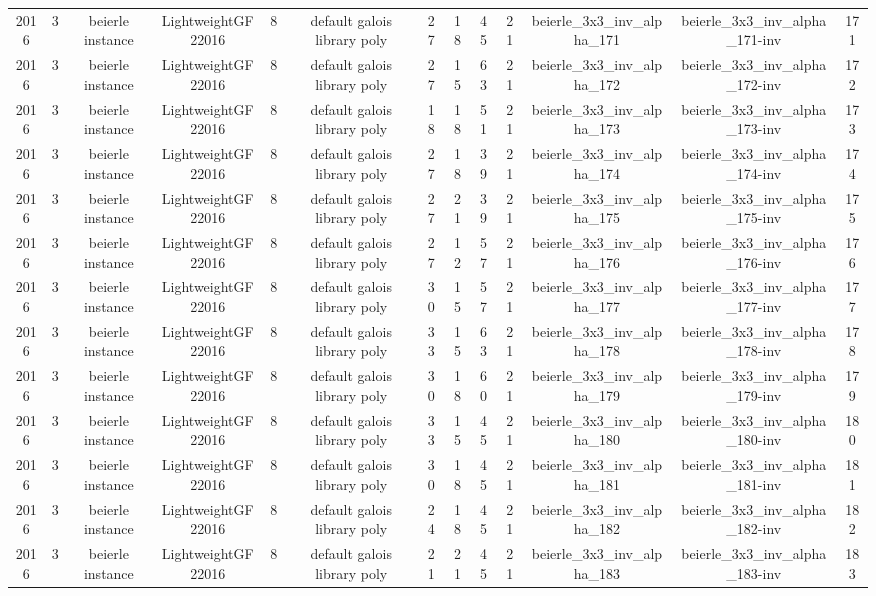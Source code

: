 \begin{tabular}{c c c c c c c c c c c c c}
2016 & 3 & beierle instance & LightweightGF22016 & 8 & default galois library poly & 27 & 18 & 45 & 21 & beierle_3x3_inv_alpha_171 & beierle_3x3_inv_alpha_171-inv & 171 \\
2016 & 3 & beierle instance & LightweightGF22016 & 8 & default galois library poly & 27 & 15 & 63 & 21 & beierle_3x3_inv_alpha_172 & beierle_3x3_inv_alpha_172-inv & 172 \\
2016 & 3 & beierle instance & LightweightGF22016 & 8 & default galois library poly & 18 & 18 & 51 & 21 & beierle_3x3_inv_alpha_173 & beierle_3x3_inv_alpha_173-inv & 173 \\
2016 & 3 & beierle instance & LightweightGF22016 & 8 & default galois library poly & 27 & 18 & 39 & 21 & beierle_3x3_inv_alpha_174 & beierle_3x3_inv_alpha_174-inv & 174 \\
2016 & 3 & beierle instance & LightweightGF22016 & 8 & default galois library poly & 27 & 21 & 39 & 21 & beierle_3x3_inv_alpha_175 & beierle_3x3_inv_alpha_175-inv & 175 \\
2016 & 3 & beierle instance & LightweightGF22016 & 8 & default galois library poly & 27 & 12 & 57 & 21 & beierle_3x3_inv_alpha_176 & beierle_3x3_inv_alpha_176-inv & 176 \\
2016 & 3 & beierle instance & LightweightGF22016 & 8 & default galois library poly & 30 & 15 & 57 & 21 & beierle_3x3_inv_alpha_177 & beierle_3x3_inv_alpha_177-inv & 177 \\
2016 & 3 & beierle instance & LightweightGF22016 & 8 & default galois library poly & 33 & 15 & 63 & 21 & beierle_3x3_inv_alpha_178 & beierle_3x3_inv_alpha_178-inv & 178 \\
2016 & 3 & beierle instance & LightweightGF22016 & 8 & default galois library poly & 30 & 18 & 60 & 21 & beierle_3x3_inv_alpha_179 & beierle_3x3_inv_alpha_179-inv & 179 \\
2016 & 3 & beierle instance & LightweightGF22016 & 8 & default galois library poly & 33 & 15 & 45 & 21 & beierle_3x3_inv_alpha_180 & beierle_3x3_inv_alpha_180-inv & 180 \\
2016 & 3 & beierle instance & LightweightGF22016 & 8 & default galois library poly & 30 & 18 & 45 & 21 & beierle_3x3_inv_alpha_181 & beierle_3x3_inv_alpha_181-inv & 181 \\
2016 & 3 & beierle instance & LightweightGF22016 & 8 & default galois library poly & 24 & 18 & 45 & 21 & beierle_3x3_inv_alpha_182 & beierle_3x3_inv_alpha_182-inv & 182 \\
2016 & 3 & beierle instance & LightweightGF22016 & 8 & default galois library poly & 21 & 21 & 45 & 21 & beierle_3x3_inv_alpha_183 & beierle_3x3_inv_alpha_183-inv & 183 \\

\end{tabular}
